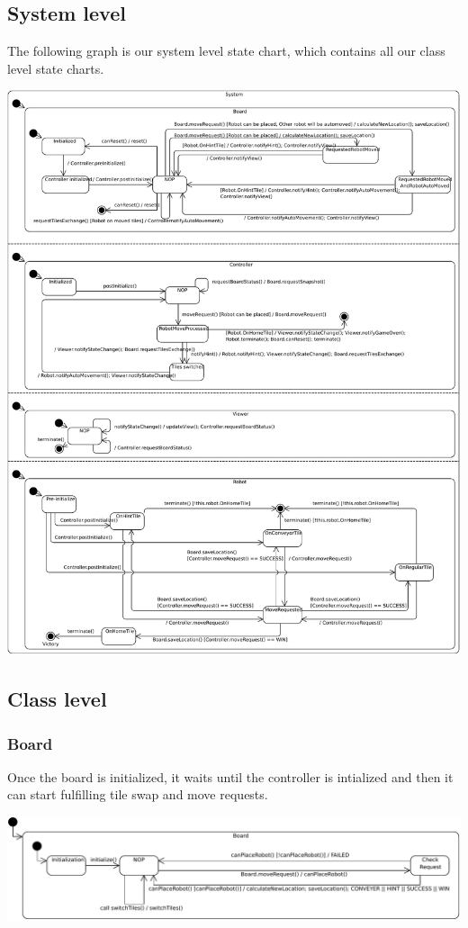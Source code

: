 \subsection{System level}
	The following graph is our system level state chart, which contains all our class level state charts.

	\includegraphics[width=\linewidth]{statecharts/system.pdf}

\subsection{Class level}
	\subsubsection{Board}
	Once the board is initialized, it waits until the controller is intialized and then it can start fulfilling tile swap and move requests.
	
	\includegraphics[width=\linewidth]{statecharts/board.pdf}

